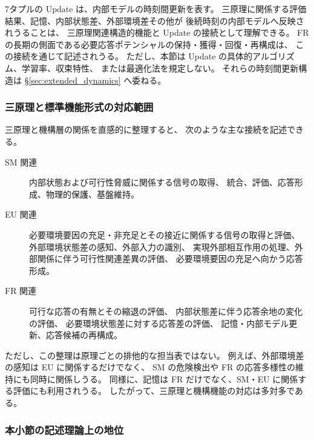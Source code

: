 \begin{remark}
\label{rem:update_principle_connection}
7タプルの $\mathrm{Update}$ は、内部モデルの時刻間更新を表す。
三原理に関係する評価結果、記憶、内部状態差、外部環境差その他が
後続時刻の内部モデルへ反映されうることは、
三原理関連構造的機能と Update の接続として理解できる。
FR の長期の側面である必要応答ポテンシャルの保持・獲得・回復・再構成は、
この接続を通じて記述されうる。
ただし、本節は Update の具体的アルゴリズム、学習率、収束特性、
または最適化法を規定しない。
それらの時刻間更新構造は \S\ref{sec:extended_dynamics} へ委ねる。
\end{remark}

\subsubsection{三原理と標準機能形式の対応範囲}

\begin{remark}[原理別の主な機能接続は重複しうる]
\label{rem:principle_function_overlap}
三原理と機構層の関係を直感的に整理すると、
次のような主な接続を記述できる。

\begin{description}

  \item[SM 関連]
  内部状態および可行性脅威に関係する信号の取得、
  統合、評価、応答形成、物理的保護、基盤維持。

  \item[EU 関連]
  必要環境要因の充足・非充足とその接近に関係する信号の取得と評価、
  外部環境状態差の感知、外部入力の識別、
  実現外部相互作用の処理、外部関係に伴う可行性関連差異の評価、
  必要環境要因の充足へ向かう応答形成。

  \item[FR 関連]
  可行な応答の有無とその縮退の評価、
  内部状態差に伴う応答余地の変化の評価、
  必要環境状態差に対する応答差の評価、
  記憶・内部モデル更新、応答候補の再構成。

\end{description}

ただし、この整理は原理ごとの排他的な担当表ではない。
例えば、外部環境差の感知は EU に関係するだけでなく、
SM の危険検出や FR の応答多様性の維持にも同時に関係しうる。
同様に、記憶は FR だけでなく、SM・EU に関係する評価にも利用されうる。
したがって、三原理と機構機能の対応は多対多である。
\end{remark}

\subsubsection{本小節の記述理論上の地位}

